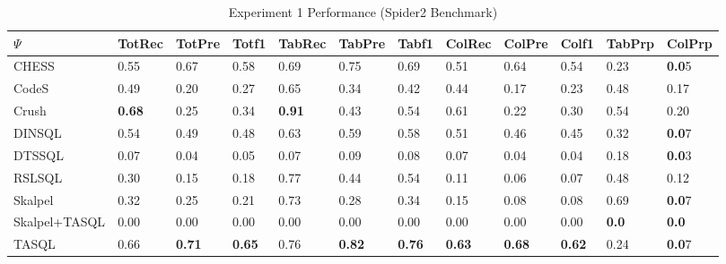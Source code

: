 \begin{table}
\caption{Experiment 1 Performance (Spider2 Benchmark)}
\label{tab:exp1-spider2}
\begin{tabular}{llllllllllll}
\toprule
$\Psi$ & TotRec & TotPre & Totf1 & TabRec & TabPre & Tabf1 & ColRec & ColPre & Colf1 & TabPrp & ColPrp \\
\midrule
CHESS & 0.55 & 0.67 & 0.58 & 0.69 & 0.75 & 0.69 & 0.51 & 0.64 & 0.54 & 0.23 & \textbf{0.0}5 \\
CodeS & 0.49 & 0.20 & 0.27 & 0.65 & 0.34 & 0.42 & 0.44 & 0.17 & 0.23 & 0.48 & 0.17 \\
Crush & \textbf{0.68} & 0.25 & 0.34 & \textbf{0.91} & 0.43 & 0.54 & 0.61 & 0.22 & 0.30 & 0.54 & 0.20 \\
DINSQL & 0.54 & 0.49 & 0.48 & 0.63 & 0.59 & 0.58 & 0.51 & 0.46 & 0.45 & 0.32 & \textbf{0.0}7 \\
DTSSQL & 0.07 & 0.04 & 0.05 & 0.07 & 0.09 & 0.08 & 0.07 & 0.04 & 0.04 & 0.18 & \textbf{0.0}3 \\
RSLSQL & 0.30 & 0.15 & 0.18 & 0.77 & 0.44 & 0.54 & 0.11 & 0.06 & 0.07 & 0.48 & 0.12 \\
Skalpel & 0.32 & 0.25 & 0.21 & 0.73 & 0.28 & 0.34 & 0.15 & 0.08 & 0.08 & 0.69 & \textbf{0.0}7 \\
Skalpel+TASQL & 0.00 & 0.00 & 0.00 & 0.00 & 0.00 & 0.00 & 0.00 & 0.00 & 0.00 & \textbf{0.0} & \textbf{0.0} \\
TASQL & 0.66 & \textbf{0.71} & \textbf{0.65} & 0.76 & \textbf{0.82} & \textbf{0.76} & \textbf{0.63} & \textbf{0.68} & \textbf{0.62} & 0.24 & \textbf{0.0}7 \\
\bottomrule
\end{tabular}
\end{table}
